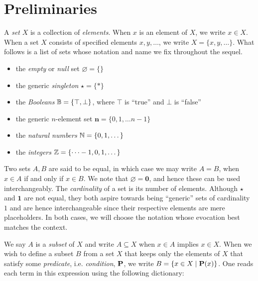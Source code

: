 \section{Preliminaries}
A \emph{set} $X$ is a collection of \emph{elements}. When $x$ is an element of $X$, we write $x\in X$. When a set $X$ consists of specified elements $x,y,\dots$, we write $X=\{x,y,\dots\}$. What follows is a list of sets whose notation and name we fix throughout the sequel.

\begin{itemize}
    \item the \emph{empty} or \emph{null} set $\varnothing=\{\}$
    \item the generic \emph{singleton} $\star=\{*\}$
    \item the \emph{Booleans} $\mathbb B=\{\top,\bot\}$, where $\top$ is ``true'' and $\bot$ is ``false''
    \item the generic $n$-element set $\mathbf{n}=\{0,1,\dots n-1\}$
    \item the \emph{natural numbers} $\mathbb N=\{0,1,\dots\}$
    \item the \emph{integers} $\mathbb Z=\{\dots -1,0,1,\dots\}$
\end{itemize}

Two sets $A,B$ are said to be equal, in which case we may write $A=B$, when $x\in A$ if and only if $x \in B$. We note that $\varnothing = \mathbf{0}$, and hence these can be used interchangeably. The \emph{cardinality} of a set is its number of elements. Although $\star$ and $\mathbf{1}$ are not equal, they both aspire towards being ``generic'' sets of cardinality $1$ and are hence interchangeable since their respective elements are mere placeholders. In both cases, we will choose the notation whose evocation best matches the context.

We say $A$ is a \emph{subset} of $X$ and write $A\subseteq X$ when $x\in A$ implies $x\in X$.
When we wish to define a subset $B$ from a set $X$ that keeps only the elements of $X$ that satisfy some \emph{predicate}, i.e. \emph{condition}, $\mathbf P$, we write $B=\{x\in X \mid \mathbf P(x)\}$. One reads each term in this expression using the following dictionary:

